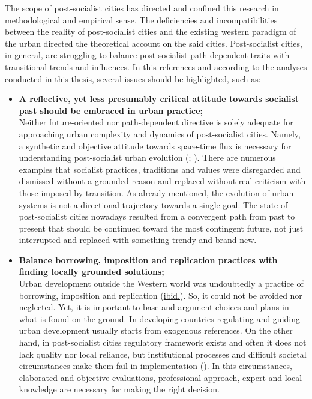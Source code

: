 \documentclass[11pt]{report}
\begin{document}
{{{The scope of post-socialist cities has directed and confined this research in methodological and empirical sense.
The deficiencies and incompatibilities between the reality of post-socialist cities and the existing western paradigm of the urban directed the theoretical account on the said cities.
Post-socialist cities, in general, are struggling to balance post-socialist path-dependent traits with transitional trends and influences.
In this references and according to the analyses conducted in this thesis, several issues should be highlighted, such as:

\begin{itemize}
\item \textbf{A reflective, yet less presumably critical attitude towards socialist past should be embraced in urban practice;}
\\
Neither future-oriented nor path-dependent directive is solely adequate for approaching urban complexity and dynamics of  post-socialist cities. Namely, a synthetic and objective attitude towards space-time flux is necessary for understanding post-socialist urban evolution (\href{Thomas}{\citealt{thomas_thinking_1998}}; \href{Nedovic}{\citealt{nedovicbudic_waves_2006}}).
There are numerous examples that socialist practices, traditions and values were disregarded and dismissed without a grounded reason and replaced without real criticism with those imposed by transition.
As already mentioned, the evolution of urban systems is not a directional trajectory towards a single goal.
The state of post-socialist cities nowadays resulted from a convergent path from past to present that should be continued toward the most contingent future, not just interrupted and replaced with something trendy and brand  new.

\item \textbf{Balance borrowing, imposition and replication practices with finding locally grounded solutions;}
\\
Urban development outside the Western world was undoubtedly a practice of borrowing, imposition and replication (\href{Nedovic}{ibid.}). So, it could not be avoided nor neglected.
Yet, it is important to base and argument choices and plans in what is found on the ground.
In developing countries regulating and guiding urban development usually starts from exogenous references.
On the other hand,  in post-socialist cities regulatory framework exists and often it does not lack quality nor local reliance, but institutional processes and difficult societal circumstances make them fail in implementation (\href{Nedovic}{\citealt{nedovic-budic_mornings_2011}}). In this circumstances, elaborated and objective evaluations, professional approach, expert and local knowledge are necessary for making the right decision.


\end{itemize}}}}
\end{document}
